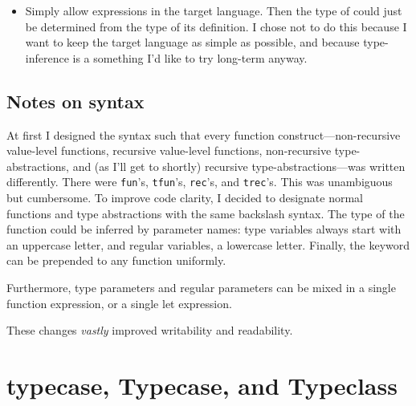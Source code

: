 \documentclass[pageno]{jpaper}
\begin{document}
{{{\begin{itemize}
\begin{lstlisting}
  (\ f => f 73 5)
    (\ (x:Int) (\ (y:Int) => x + y))
\end{lstlisting}

the type inference algorithm would figure out that  must have type  because
 has type .
\item Simply allow  expressions in the target language.  Then the type of  could
just be determined from the type of its definition. I chose not to do this because I want to keep the
target language as simple as possible, and because type-inference is a something I'd like to try long-term
anyway.

\end{itemize}

\subsection{Notes on syntax}

At first I designed the syntax such that every function construct---non-recursive value-level functions, recursive value-level functions, non-recursive type-abstractions, and (as I'll get to shortly) recursive type-abstractions---was written differently. There were \texttt{fun}'s, \texttt{tfun}'s, \texttt{rec}'s, and
\texttt{trec}'s. This was unambiguous but cumbersome. To improve code clarity, I decided to
designate normal functions and type abstractions with the same backslash syntax.
The type of the function could be inferred by parameter names: type variables always start with an
uppercase letter, and regular variables, a lowercase letter. Finally, the  keyword can be
prepended to any function uniformly.

Furthermore, type parameters and regular parameters can be mixed in a single function expression,
or a single let expression.

These changes \textit{vastly} improved writability and readability.

\section{typecase, Typecase, and Typeclass}

}}}
\end{document}
